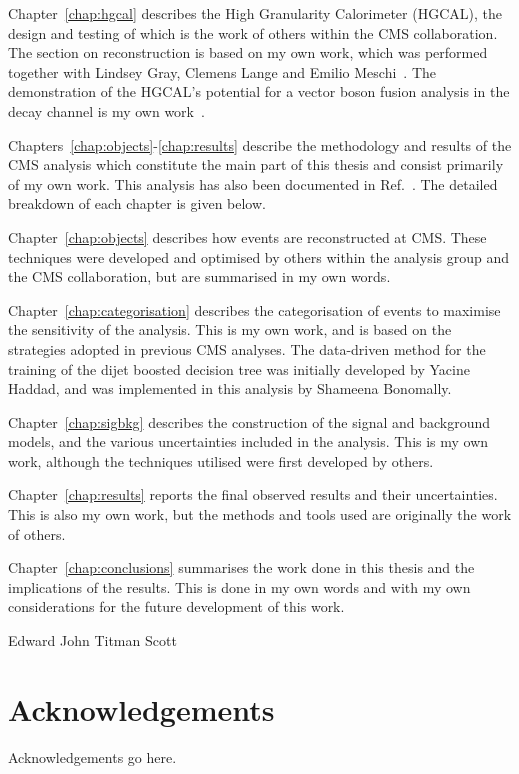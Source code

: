 Chapter~\ref{chap:hgcal} describes the High Granularity Calorimeter (HGCAL), 
the design and testing of which is the work of others within the CMS collaboration. 
The section on reconstruction is based on my own work, 
which was performed together with Lindsey Gray, Clemens Lange and Emilio Meschi~\cite{ClusteringConf}.
The demonstration of the HGCAL's potential for a vector boson fusion analysis 
in the \Hgg decay channel is my own work~\cite{HGCAL}.

Chapters~\ref{chap:objects}-\ref{chap:results} describe the methodology and results of the CMS \Hgg analysis
which constitute the main part of this thesis and consist primarily of my own work.
This analysis has also been documented in Ref.~\cite{HIG-18-029}.
The detailed breakdown of each chapter is given below.

Chapter~\ref{chap:objects} describes how events are reconstructed at CMS.
These techniques were developed and optimised by others within the \Hgg analysis group 
and the CMS collaboration, but are summarised in my own words.

Chapter~\ref{chap:categorisation} describes the categorisation of events 
to maximise the sensitivity of the analysis.
This is my own work, and is based on the strategies adopted in previous CMS \Hgg analyses.
The data-driven method for the training of the dijet boosted decision tree 
was initially developed by Yacine Haddad, and was implemented in this analysis by Shameena Bonomally.

Chapter~\ref{chap:sigbkg} describes the construction of the signal and background models, 
and the various uncertainties included in the analysis.
This is my own work, although the techniques utilised were first developed by others.

Chapter~\ref{chap:results} reports the final observed results and their uncertainties.
This is also my own work, but the methods and tools used are originally the work of others.

Chapter~\ref{chap:conclusions} summarises the work done in this thesis 
and the implications of the results.
This is done in my own words and with my own considerations for the future development of this work.

\begin{flushright}
    Edward John Titman Scott
\end{flushright}


\chapter*{\centering Acknowledgements}
Acknowledgements go here.



